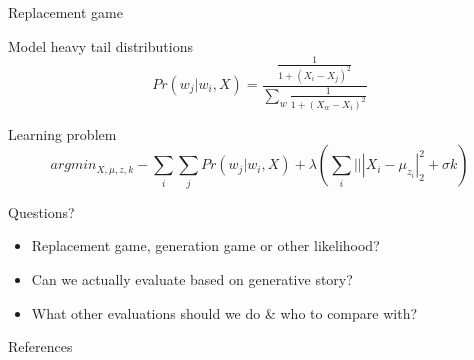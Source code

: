 \documentclass{beamer}
\begin{document}
\begin{frame}{Replacement game}
  \begin{block}{Model heavy tail distributions}
    $$Pr(w_j|w_i, X) = \frac{\frac{1}{1+(X_i-X_j)^2}}{\sum_{w}\frac{1}{1+(X_w-X_i)^2}}$$
  \end{block}
  \pause
  \begin{block}{Learning problem}
    $$argmin_{X, \mu, z, k} -\sum_{i}\sum_{j}Pr(w_j|w_i, X)+\lambda(\sum_i|||X_i-\mu_{z_i}|_2^2 + \sigma k)$$
  \end{block}
\end{frame}

\begin{frame}{Questions?}
  \begin{itemize}
    \item Replacement game, generation game or other likelihood?
    \item Can we actually evaluate based on generative story?
    \item What other evaluations should we do \& who to compare with?
  \end{itemize}
\end{frame}

\appendix

\begin{frame}[allowframebreaks]{References}
  
  
\end{frame}
\end{document}
